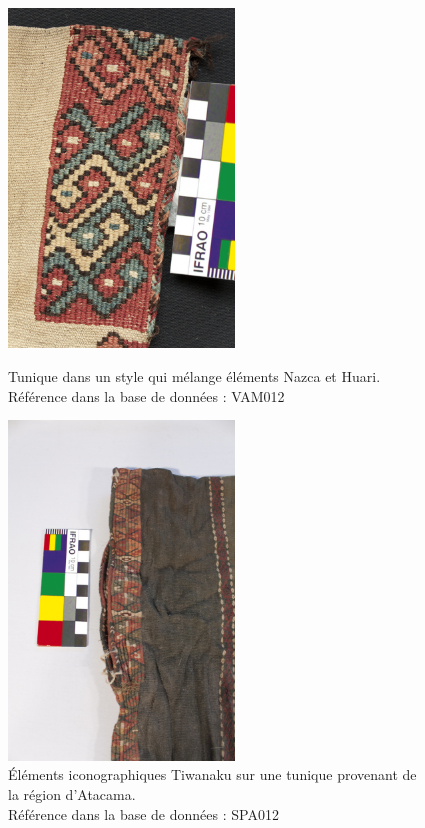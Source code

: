 \begin{figure}[!h]
    \begin{minipage}[c]{.5\linewidth}
    \begin{center}
     	\includegraphics[width=6cm]{../images/VAM012.jpg}
     	\caption{Tunique dans un style qui mélange éléments Nazca et Huari. \\ Référence dans la base de données : VAM012}
    	\label{fig:VAM012}
    \end{center}
    \end{minipage}
    \hspace{5pt}
    \begin{minipage}[c]{.5\linewidth}
        		\begin{center}
         		\includegraphics[width=6cm]{../images/SPA012.jpg}
         		\caption{Éléments iconographiques Tiwanaku sur une tunique provenant de la région d'Atacama. \\ Référence dans la base de données : SPA012}
			\label{fig:SPA012}
		\end{center}
	\end{minipage}
\end{figure}

